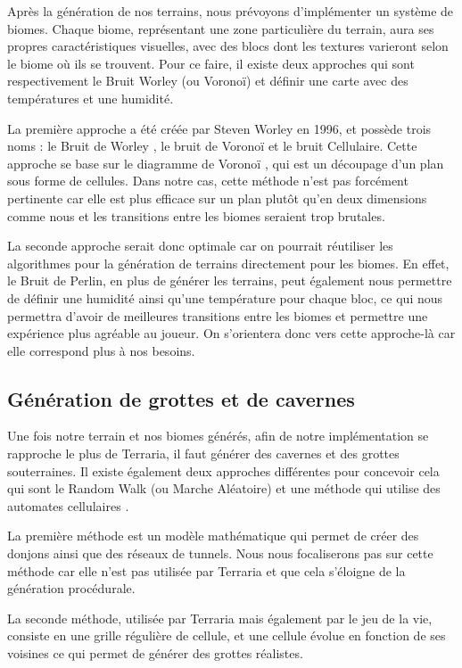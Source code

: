 \documentclass{article}
\begin{document}
Après la génération de nos terrains, nous prévoyons d'implémenter un système de biomes. Chaque biome, représentant une zone particulière du terrain, aura ses propres caractéristiques visuelles, avec des blocs dont les textures varieront selon le biome où ils se trouvent. Pour ce faire, il existe deux approches qui sont respectivement le Bruit Worley (ou Voronoï) et définir une carte avec des températures et une humidité.\par
La première approche a été créée par Steven Worley en 1996, et possède trois noms : le Bruit de Worley \cite{worley_noise}, le bruit de Voronoï et le bruit Cellulaire. Cette approche se base sur le diagramme de Voronoï \cite{voronoi_diagram}, qui est un découpage d'un plan sous forme de cellules. Dans notre cas, cette méthode n'est pas forcément pertinente car elle est plus efficace sur un plan plutôt qu'en deux dimensions comme nous et les transitions entre les biomes seraient trop brutales.\par
La seconde approche serait donc optimale car on pourrait réutiliser les algorithmes pour la génération de terrains directement pour les biomes. En effet, le Bruit de Perlin, en plus de générer les terrains, peut également nous permettre de définir une humidité ainsi qu'une température pour chaque bloc, ce qui nous permettra d'avoir de meilleures transitions entre les biomes et permettre une expérience plus agréable au joueur. On s'orientera donc vers cette approche-là car elle correspond plus à nos besoins. 

\subsection{Génération de grottes et de cavernes}
Une fois notre terrain et nos biomes générés, afin de notre implémentation se rapproche le plus de Terraria, il faut générer des cavernes et des grottes souterraines. Il existe également deux approches différentes pour concevoir cela qui sont le Random Walk \cite{random_walk} (ou Marche Aléatoire) et une méthode qui utilise des automates cellulaires \cite{automate_cellulaire}.\par
La première méthode est un modèle mathématique qui permet de créer des donjons ainsi que des réseaux de tunnels. Nous nous focaliserons pas sur cette méthode car elle n'est pas utilisée par Terraria et que cela s'éloigne de la génération procédurale.\par 
La seconde méthode, utilisée par Terraria mais également par le jeu de la vie, consiste en une grille régulière de cellule, et une cellule évolue en fonction de ses voisines ce qui permet de générer des grottes réalistes.
\end{document}

